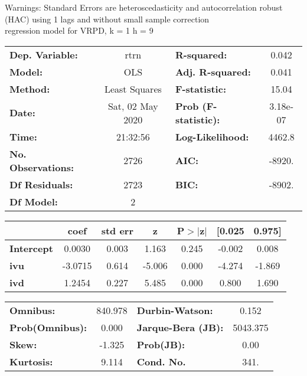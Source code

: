 Warnings: \newline
 [1] Standard Errors are heteroscedasticity and autocorrelation robust (HAC) using 1 lags and without small sample correction\\ 

regression model for VRPD, k = 1 h = 9\begin{center}
\begin{tabular}{lclc}
\toprule
\textbf{Dep. Variable:}    &       rtrn       & \textbf{  R-squared:         } &     0.042   \\
\textbf{Model:}            &       OLS        & \textbf{  Adj. R-squared:    } &     0.041   \\
\textbf{Method:}           &  Least Squares   & \textbf{  F-statistic:       } &     15.04   \\
\textbf{Date:}             & Sat, 02 May 2020 & \textbf{  Prob (F-statistic):} &  3.18e-07   \\
\textbf{Time:}             &     21:32:56     & \textbf{  Log-Likelihood:    } &    4462.8   \\
\textbf{No. Observations:} &        2726      & \textbf{  AIC:               } &    -8920.   \\
\textbf{Df Residuals:}     &        2723      & \textbf{  BIC:               } &    -8902.   \\
\textbf{Df Model:}         &           2      & \textbf{                     } &             \\
\bottomrule
\end{tabular}
\begin{tabular}{lcccccc}
                   & \textbf{coef} & \textbf{std err} & \textbf{z} & \textbf{P$> |$z$|$} & \textbf{[0.025} & \textbf{0.975]}  \\
\midrule
\textbf{Intercept} &       0.0030  &        0.003     &     1.163  &         0.245        &       -0.002    &        0.008     \\
\textbf{ivu}       &      -3.0715  &        0.614     &    -5.006  &         0.000        &       -4.274    &       -1.869     \\
\textbf{ivd}       &       1.2454  &        0.227     &     5.485  &         0.000        &        0.800    &        1.690     \\
\bottomrule
\end{tabular}
\begin{tabular}{lclc}
\textbf{Omnibus:}       & 840.978 & \textbf{  Durbin-Watson:     } &    0.152  \\
\textbf{Prob(Omnibus):} &   0.000 & \textbf{  Jarque-Bera (JB):  } & 5043.375  \\
\textbf{Skew:}          &  -1.325 & \textbf{  Prob(JB):          } &     0.00  \\
\textbf{Kurtosis:}      &   9.114 & \textbf{  Cond. No.          } &     341.  \\
\bottomrule
\end{tabular}
\end{center}

